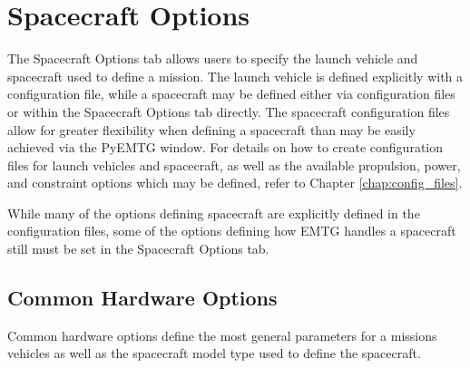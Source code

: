\section{Spacecraft Options}
\label{sec:spacecraft_options}

The Spacecraft Options tab allows users to specify the launch vehicle and spacecraft used to define a mission. The launch vehicle is defined explicitly with a configuration file, while a spacecraft may be defined either via configuration files or within the Spacecraft Options tab directly. The spacecraft configuration files allow for greater flexibility when defining a spacecraft than may be easily achieved via the PyEMTG window. For details on how to create configuration files for launch vehicles and spacecraft, as well as the available propulsion, power, and constraint options which may be defined, refer to Chapter \ref{chap:config_files}.

\noindent While many of the options defining spacecraft are explicitly defined in the configuration files, some of the options defining how \ac{EMTG} handles a spacecraft still must be set in the Spacecraft Options tab.

\subsection{Common Hardware Options}
Common hardware options define the most general parameters for a missions vehicles as well as the spacecraft model type used to define the spacecraft.


